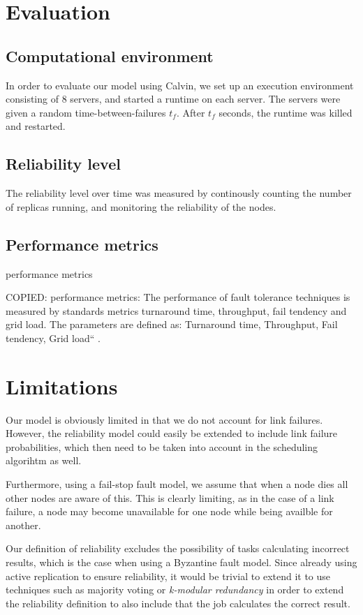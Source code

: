 \documentclass{cslthse-msc}
\begin{document}
\chapter{Evaluation} \label{ch:evaluation}

\section{Computational environment}
In order to evaluate our model using Calvin, we set up an execution environment consisting of 8 servers, and started a runtime on each server. The servers were given a random time-between-failures $t_f$. After $t_f$ seconds, the runtime was killed and restarted.

\section{Reliability level}
The reliability level over time was measured by continously counting the number of replicas running, and monitoring the reliability of the nodes.

\section{Performance metrics}
performance metrics

COPIED:
performance metrics: The performance of fault tolerance techniques is measured by standards metrics turnaround time, throughput, fail tendency and grid load. The parameters are defined as:
Turnaround time, Throughput, Fail tendency, Grid load“ \cite{faultToleranceGrid}. 



\chapter{Limitations} \label{ch:limitations}

Our model is obviously limited in that we do not account for link failures. However, the reliability model could easily be extended to include link failure probabilities, which then need to be taken into account in the scheduling algorihtm as well.

Furthermore, using a fail-stop fault model, we assume that when a node dies all other nodes are aware of this. This is clearly limiting, as in the case of a link failure, a node may become unavailable for one node while being availble for another.

Our definition of reliability excludes the possibility of tasks calculating incorrect results, which is the case when using a Byzantine fault model. Since already using active replication to ensure reliability, it would be trivial to extend it to use techniques such as majority voting or \emph{k-modular redundancy} in order to extend the reliability definition to also include that the job calculates the correct result.
\end{document}
